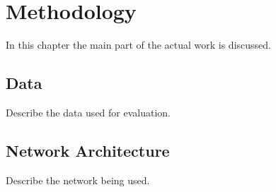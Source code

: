 \documentclass[english,version-2022-01]{uzl-thesis} %
\begin{document}

\chapter{Methodology}
In this chapter the main part of the actual work is discussed.

\section{Data}
Describe the data used for evaluation.

\section{Network Architecture}
Describe the network being used.
\end{document}
